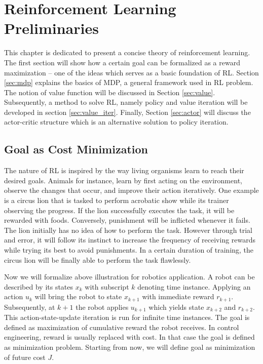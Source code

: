 \chapter{Reinforcement Learning Preliminaries}
This chapter is dedicated to present a concise theory of reinforcement learning. The first section will show how a certain goal can be formalized as a reward maximization -- one of the ideas which serves as a basic foundation of \acs{RL}. Section \ref{sec:mdp} explains the basics of \acs{MDP}, a general framework used in \acs{RL} problem. The notion of value function will be discussed in Section \ref{sec:value}. Subsequently, a method to solve \acs{RL}, namely policy and value iteration will be developed in section \ref{sec:value_iter}. Finally, Section \ref{sec:actor} will discuss the actor-critic structure which is an alternative solution to policy iteration.

\section{Goal as Cost Minimization}
The nature of \acs{RL} is inspired by the way living organisms learn to reach their desired goals. Animals for instance, learn by first acting on the environment, observe the changes that occur, and improve their action iteratively. One example is a circus lion that is tasked to perform acrobatic show while its trainer observing the progress. If the lion successfully executes the task, it will be rewarded with foods. Conversely, punishment will be inflicted whenever it fails. The lion initially has no idea of how to perform the task. However through trial and error, it will follow its instinct to increase the frequency of receiving rewards while trying its best to avoid punishments. In a certain duration of training, the circus lion will be finally able to perform the task flawlessly. 

Now we will formalize above illustration for robotics application. A robot can be described by its states $x_k$ with subscript $k$ denoting time instance. Applying an action $u_k$ will bring the robot to state $x_{k+1}$ with immediate reward $r_{k+1}$. Subsequently, at $k+1$ the robot applies $u_{k+1}$ which yields state $x_{k+2}$ and $r_{k+2}$. This action-state-update iteration is run for infinite time instances. The goal is defined as maximization of cumulative reward the robot receives. In control engineering, reward is usually replaced with cost. In that case the goal is defined as minimization problem. Starting from now, we will define goal as minimization of future cost $J$.

